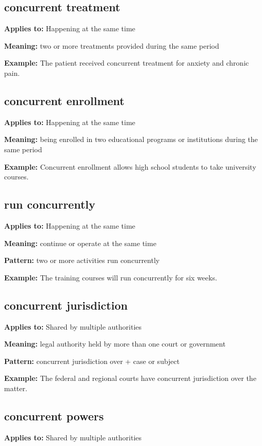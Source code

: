 \documentclass[11pt]{article}
\begin{document}
\subsection{concurrent treatment}
\textbf{Applies to:} Happening at the same time

\textbf{Meaning:} two or more treatments provided during the same period

\textbf{Example:} The patient received concurrent treatment for anxiety and chronic pain.

\subsection{concurrent enrollment}
\textbf{Applies to:} Happening at the same time

\textbf{Meaning:} being enrolled in two educational programs or institutions during the same period

\textbf{Example:} Concurrent enrollment allows high school students to take university courses.

\subsection{run concurrently}
\textbf{Applies to:} Happening at the same time

\textbf{Meaning:} continue or operate at the same time

\textbf{Pattern:} two or more activities run concurrently

\textbf{Example:} The training courses will run concurrently for six weeks.

\subsection{concurrent jurisdiction}
\textbf{Applies to:} Shared by multiple authorities

\textbf{Meaning:} legal authority held by more than one court or government

\textbf{Pattern:} concurrent jurisdiction over + case or subject

\textbf{Example:} The federal and regional courts have concurrent jurisdiction over the matter.

\subsection{concurrent powers}
\textbf{Applies to:} Shared by multiple authorities
\end{document}
